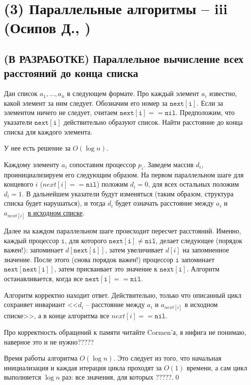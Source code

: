 \section{(3) Параллельные алгоритмы -- iii (Осипов Д., \groth)}
\newcommand{\nxt}[1] {\mathtt{next[#1]}}
\newcommand{\nil} {\mathtt{nil}}
\subsection{(В РАЗРАБОТКЕ) Параллельное вычисление всех расстояний до конца списка}
\begin{problem}
Дан список $a_1, \ldots, a_n$  в следующем формате. Про каждый элемент $a_i$ известно, какой элемент за ним следует. Обозначим его номер за $\nxt{i}$. Если за элементом ничего не следует, считаем $\nxt{i} == \nil$. Предположим, что указатели $\nxt{i}$ действительно образуют список. Найти расстояние до конца списка для каждого элемента.
\end{problem}
У нее есть решение за $O(\log n)$.

Каждому элементу $a_i$ сопоставим процессор $p_i$. Заведем массив $d_i$, проинициализируем его следующим образом. На первом параллельном шаге для концевого $i$ ($next[i]==\nil$) положим $d_i = 0$, для всех остальных положим $d_i = 1$. В дальнейшем указатели будут изменяться (таким образом, структура списка будет нарушаться), и тогда $d_i$ будет означать расстояние между $a_i$ и $a_{next[i]}$ \underline{в исходном списке}.

Далее на каждом параллельном шаге происходит пересчет расстояний. Именно, каждый процессор $\mathtt i$, для которого $\nxt{i} \neq \nil$, делает следующее (порядок важен!): запоминает $d[\nxt{i}]$, затем увеличивает $d[i]$ на запомненное значение. После этого (снова порядок важен!) процессор $\mathtt i$ запоминает $\nxt{\nxt{i}}$, затем присваивает это значение к $\nxt{i}$. Алгоритм останавливается, когда все $\nxt{i} == \nil$.

Алгоритм корректно находит ответ. Действительно, только что описанный цикл сохраняет инвариант <<$d_i$ -- расстояние между $a_i$ и $a_{next[i]}$ в исходном списке>>, а в конце алгоритма все $next[i] == \nil$. 

Про корректность обращений к памяти читайте Cormen'а, я нифига не понимаю, наверное это и не нужно?????

Время работы алгоритма $O(\log n)$. Это следует из того, что начальная инициализация и каждая итерация цикла проходят за $O(1)$ времени, а сам цикл выполняется $\log n$ раз: все значения, для которых ?????.\qed

